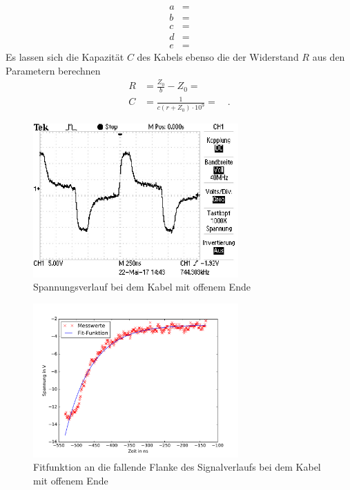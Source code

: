 \begin{align}
		a &=  \\
		b &=  \\
		c &=  \\
		d &=  \\
		e &=  
\end{align}
Es lassen sich die Kapazität $C$ des Kabels ebenso die der Widerstand $R$ aus den Parametern berechnen 
\begin{align}
	R &= \frac{Z_0}{b} - Z_0 =  \\
	C &= \frac{1}{ c (r + Z_0) \cdot 10^9} =  \quad.
\end{align}

\clearpage

\begin{figure}
	\centering
	\includegraphics[width=0.7\textwidth]{Laplace/offen.pdf}
	\caption{Spannungsverlauf bei dem Kabel mit offenem Ende}
	\label{fig:oszi_offen}
\end{figure}

\begin{figure}
	\centering
	\includegraphics[width=0.7\textwidth]{Laplace/offenes_ende.pdf}
	\caption{Fitfunktion an die fallende Flanke des Signalverlaufs bei dem Kabel mit offenem Ende}
	\label{fig:fit_offen}
\end{figure}
